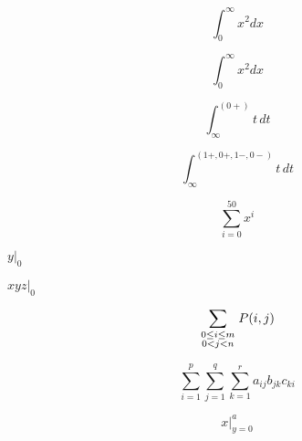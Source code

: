 \documentclass{article}
\begin{document}

\[ \int_0^\infty x^2 dx \]

\[ \int_0^\infty x^2 d\mathord{x} \]

\[ \int_\infty^{(0+)} t\,dt \]

\[ \int_\infty^{(1+,0+,1-,0-)} t\,dt \]

\[ \sum_{i=0}^{50} x^i \]

$\left. y \right|_0$

$\left. xyz \right|_0$

\[\sum_{\scriptstyle0\le i\le m\atop\scriptstyle0<j<n}P(i,j) \]

\[\sum_{i=1}^p\sum_{j=1}^q\sum_{k=1}^r a_{ij}b_{jk}c_{ki} \]

\[ x | ^{a}_{y=0} \] %
\end{document}
